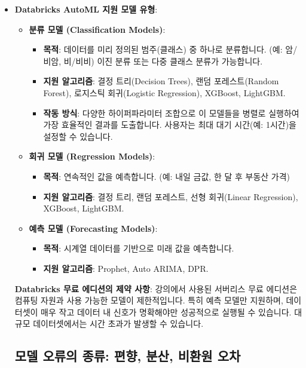 \documentclass[11pt,a4paper]{article}
\begin{document}
\begin{itemize}
    \item \textbf{Databricks AutoML 지원 모델 유형}:
    \begin{itemize}
        \item \textbf{분류 모델 (Classification Models)}:
        \begin{itemize}
            \item \textbf{목적}: 데이터를 미리 정의된 범주(클래스) 중 하나로 분류합니다. (예: 암/비암, 비/비비) 이진 분류 또는 다중 클래스 분류가 가능합니다.
            \item \textbf{지원 알고리즘}: 결정 트리(Decision Trees), 랜덤 포레스트(Random Forest), 로지스틱 회귀(Logistic Regression), XGBoost, LightGBM.
            \item \textbf{작동 방식}: 다양한 하이퍼파라미터 조합으로 이 모델들을 병렬로 실행하여 가장 효율적인 결과를 도출합니다. 사용자는 최대 대기 시간(예: 1시간)을 설정할 수 있습니다.
        \end{itemize}
        \item \textbf{회귀 모델 (Regression Models)}:
        \begin{itemize}
            \item \textbf{목적}: 연속적인 값을 예측합니다. (예: 내일 금값, 한 달 후 부동산 가격)
            \item \textbf{지원 알고리즘}: 결정 트리, 랜덤 포레스트, 선형 회귀(Linear Regression), XGBoost, LightGBM.
        \end{itemize}
        \item \textbf{예측 모델 (Forecasting Models)}:
        \begin{itemize}
            \item \textbf{목적}: 시계열 데이터를 기반으로 미래 값을 예측합니다.
            \item \textbf{지원 알고리즘}: Prophet, Auto ARIMA, DPR.
        \end{itemize}
    \end{itemize}

    \begin{warningbox}
        \textbf{Databricks 무료 에디션의 제약 사항}:
        강의에서 사용된 서버리스 무료 에디션은 컴퓨팅 자원과 사용 가능한 모델이 제한적입니다. 특히 예측 모델만 지원하며, 데이터셋이 매우 작고 데이터 내 신호가 명확해야만 성공적으로 실행될 수 있습니다. 대규모 데이터셋에서는 시간 초과가 발생할 수 있습니다.
    \end{warningbox}

\newpage
\subsection*{모델 오류의 종류: 편향, 분산, 비환원 오차}


\end{itemize}
\end{document}

